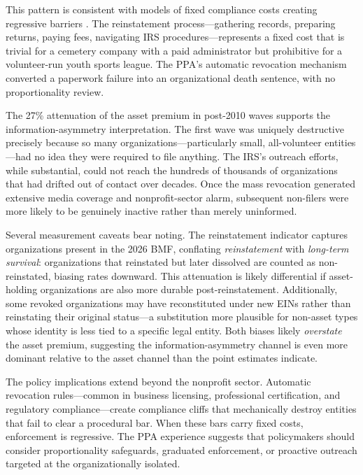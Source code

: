 \documentclass[12pt]{article}
\begin{document}
This pattern is consistent with models of fixed compliance costs creating regressive barriers \citep{decker2016}. The reinstatement process---gathering records, preparing returns, paying fees, navigating IRS procedures---represents a fixed cost that is trivial for a cemetery company with a paid administrator but prohibitive for a volunteer-run youth sports league. The PPA's automatic revocation mechanism converted a paperwork failure into an organizational death sentence, with no proportionality review.

The 27\% attenuation of the asset premium in post-2010 waves supports the information-asymmetry interpretation. The first wave was uniquely destructive precisely because so many organizations---particularly small, all-volunteer entities---had no idea they were required to file anything. The IRS's outreach efforts, while substantial, could not reach the hundreds of thousands of organizations that had drifted out of contact over decades. Once the mass revocation generated extensive media coverage and nonprofit-sector alarm, subsequent non-filers were more likely to be genuinely inactive rather than merely uninformed.

Several measurement caveats bear noting. The reinstatement indicator captures organizations present in the 2026 BMF, conflating \textit{reinstatement} with \textit{long-term survival}: organizations that reinstated but later dissolved are counted as non-reinstated, biasing rates downward. This attenuation is likely differential if asset-holding organizations are also more durable post-reinstatement. Additionally, some revoked organizations may have reconstituted under new EINs rather than reinstating their original status---a substitution more plausible for non-asset types whose identity is less tied to a specific legal entity. Both biases likely \textit{overstate} the asset premium, suggesting the information-asymmetry channel is even more dominant relative to the asset channel than the point estimates indicate.

The policy implications extend beyond the nonprofit sector. Automatic revocation rules---common in business licensing, professional certification, and regulatory compliance---create compliance cliffs that mechanically destroy entities that fail to clear a procedural bar. When these bars carry fixed costs, enforcement is regressive. The PPA experience suggests that policymakers should consider proportionality safeguards, graduated enforcement, or proactive outreach targeted at the organizationally isolated.
\end{document}
